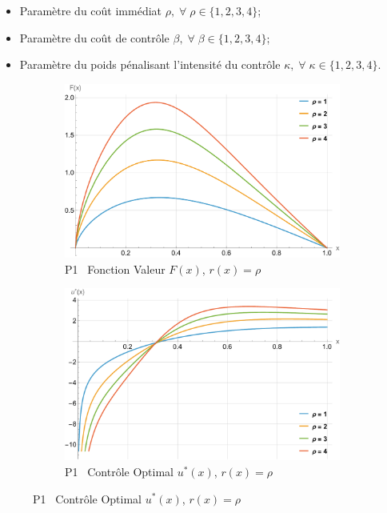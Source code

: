 \begin{itemize}
    \item Paramètre du coût immédiat $\rho,\;\forall\;\rho\in\{1,2,3,4\}$;
    \item Paramètre du coût de contrôle $\beta,\;\forall\;\beta\in\{1,2,3,4\}$;
    \item Paramètre du poids pénalisant l'intensité du contrôle $\kappa,\;\forall\;\kappa\in\{1,2,3,4\}$.
\end{itemize}
\begin{figure}[htb]
    \centering
    \begin{subfigure}{0.49\linewidth}
        \includegraphics[width=\linewidth]{img/validation/P1/p1_R_value.pdf}
        \caption{P1 \textemdash~Fonction Valeur $F(x)$, $r(x)=\rho$}\label{fig:RhoValueVisualisation1}
    \end{subfigure}
    \hfill
    \begin{subfigure}{0.49\linewidth}
        \includegraphics[width=\linewidth]{img/validation/P1/p1_R_control.pdf}
        \caption{P1 \textemdash~Contrôle Optimal $u^*(x)$, $r(x)=\rho$}\label{fig:RhoControlVisualisation1}
    \end{subfigure}


\end{figure}
